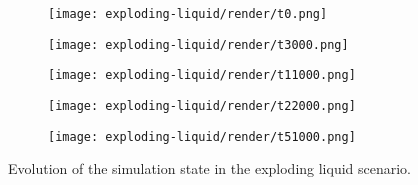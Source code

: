\label{subsec:expl}
\begin{figure}[htpb]
	\centering
	\begin{subfigure}[c]{.3\textwidth}
		\texttt{[image: exploding-liquid/render/t0.png]}
	\end{subfigure}%
	\begin{subfigure}[c]{.3\textwidth}
		\texttt{[image: exploding-liquid/render/t3000.png]}
	\end{subfigure}%
	\begin{subfigure}[c]{.3\textwidth}
		\centering
		\texttt{[image: exploding-liquid/render/t11000.png]}
	\end{subfigure}
	\hspace*{.15\textwidth}
	\begin{subfigure}[c]{.3\textwidth}
		\texttt{[image: exploding-liquid/render/t22000.png]}
	\end{subfigure}%
	\begin{subfigure}[c]{.3\textwidth}
		\texttt{[image: exploding-liquid/render/t51000.png]}
	\end{subfigure}%
	\hfill\begin{subfigure}[c]{.08\textwidth}
	\end{subfigure}
	\label{fig:evolution_expl}
	\caption{Evolution of the simulation state in the exploding liquid scenario.}
\end{figure}

